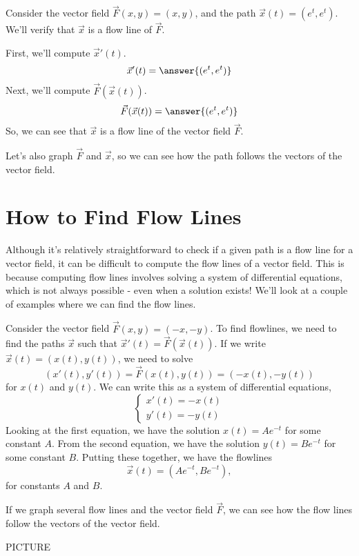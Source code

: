 \documentclass{ximera}
\begin{document}
\begin{example}
Consider the vector field $\vec{F}(x,y) = (x,y)$, and the path $\vec{x}(t) = (e^t, e^t)$. We'll verify that $\vec{x}$ is a flow line of $\vec{F}$.

First, we'll compute $\vec{x}'(t)$.
\[
\vec{x}'(t) = \answer{(e^t, e^t)}
\]
Next, we'll compute $\vec{F}(\vec{x}(t))$.
\[
\vec{F}(\vec{x}(t)) = \answer{(e^t, e^t)}
\]
So, we can see that $\vec{x}$ is a flow line of the vector field $\vec{F}$.

Let's also graph $\vec{F}$ and $\vec{x}$, so we can see how the path follows the vectors of the vector field.
\end{example}


\section*{How to Find Flow Lines}

Although it's relatively straightforward to check if a given path is a flow line for a vector field, it can be difficult to compute the flow lines of a vector field. This is because computing flow lines involves solving a system of differential equations, which is not always possible - even when a solution exists! We'll look at a couple of examples where we can find the flow lines.

\begin{example}
Consider the vector field $\vec{F}(x,y) = (-x,-y)$. To find flowlines, we need to find the paths $\vec{x}$ such that $\vec{x}'(t) = \vec{F}(\vec{x}(t))$. If we write $\vec{x}(t) = (x(t), y(t))$, we need to solve
\[
(x'(t), y'(t)) = \vec{F}(x(t), y(t)) = (-x(t), -y(t))
\]
for $x(t)$ and $y(t)$. We can write this as a system of differential equations,
\[
\begin{cases}
x'(t) = -x(t)\\
y'(t) = -y(t)
\end{cases}
\]
Looking at the first equation, we have the solution $x(t) = Ae^{-t}$ for some constant $A$. From the second equation, we have the solution $y(t) = Be^{-t}$ for some constant $B$. Putting these together, we have the flowlines
\[
\vec{x}(t) = (Ae^{-t}, Be^{-t}),
\]
for constants $A$ and $B$.

If we graph several flow lines and the vector field $\vec{F}$, we can see how the flow lines follow the vectors of the vector field.

PICTURE
\end{example}
\end{document}
